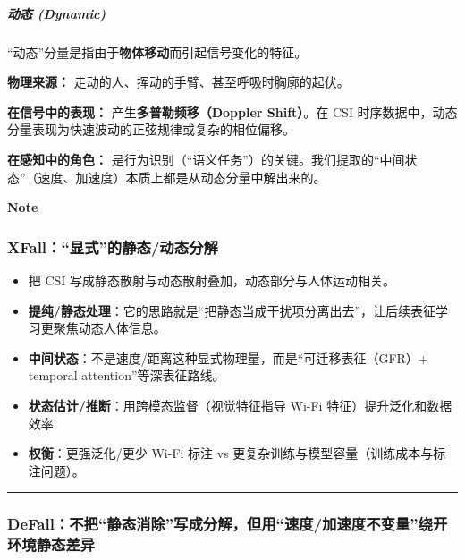 \documentclass[
]{article}
\begin{document}
\subparagraph{动态 (Dynamic)}\label{ux52a8ux6001-dynamic}

``动态''分量是指由于\textbf{物体移动}而引起信号变化的特征。

\textbf{物理来源：} 走动的人、挥动的手臂、甚至呼吸时胸廓的起伏。

\textbf{在信号中的表现：} 产生\textbf{多普勒频移（Doppler Shift）}。在
CSI 时序数据中，动态分量表现为快速波动的正弦规律或复杂的相位偏移。

\textbf{在感知中的角色：}
是行为识别（``语义任务''）的关键。我们提取的``中间状态''（速度、加速度）本质上都是从动态分量中解出来的。

\textbf{Note}\\

\subsubsection{XFall：``显式''的静态/动态分解}\label{xfallux663eux5f0fux7684ux9759ux6001ux52a8ux6001ux5206ux89e3}

\begin{itemize}
\item
  把 CSI 写成静态散射与动态散射叠加，动态部分与人体运动相关。
\item
  \textbf{提纯/静态处理}：它的思路就是``把静态当成干扰项分离出去''，让后续表征学习更聚焦动态人体信息。
\item
  \textbf{中间状态}：不是速度/距离这种显式物理量，而是``可迁移表征（GFR）+
  temporal attention''等深表征路线。
\item
  \textbf{状态估计/推断}：用跨模态监督（视觉特征指导 Wi-Fi
  特征）提升泛化和数据效率
\item
  \textbf{权衡}：更强泛化/更少 Wi-Fi 标注 vs
  更复杂训练与模型容量（训练成本与标注问题）。
\end{itemize}

\begin{center}\rule{0.5\linewidth}{0.5pt}\end{center}

\subsubsection{DeFall：不把``静态消除''写成分解，但用``速度/加速度不变量''绕开环境静态差异}\label{defallux4e0dux628aux9759ux6001ux6d88ux9664ux5199ux6210ux5206ux89e3ux4f46ux7528ux901fux5ea6ux52a0ux901fux5ea6ux4e0dux53d8ux91cfux7ed5ux5f00ux73afux5883ux9759ux6001ux5deeux5f02}
\end{document}
